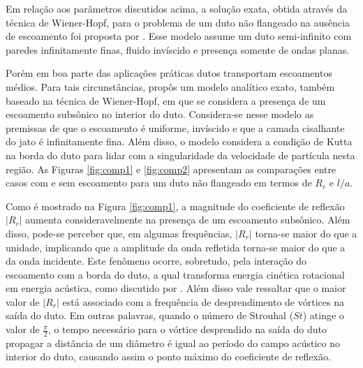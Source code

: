 Em relação aos parâmetros discutidos acima, a solução exata, obtida através da técnica de Wiener-Hopf, para o problema de um duto não flangeado na ausência de escoamento foi proposta por . Esse modelo assume um duto semi-infinito com paredes infinitamente finas, fluido invíscido e presença somente de ondas planas. 

 Porém em boa parte das aplicações práticas dutos transportam escoamentos médios. Para tais circunstâncias,  propôs um modelo analítico exato, também baseado na técnica de Wiener-Hopf, em que se considera a presença de um escoamento subsônico no interior do duto. Considera-se nesse modelo as premissas de que o escoamento é uniforme, invíscido e que a camada cisalhante do jato é infinitamente fina. Além disso, o modelo considera a condição de Kutta na borda do duto para lidar com a singularidade da velocidade de partícula nesta região. As Figuras \ref{fig:comp1} e \ref{fig:comp2} apresentam as comparações entre casos com e sem escoamento para um duto não flangeado em termos de $R_{r}$ e $l/a$.

\begin{figure}[ht!]
\centering
  
\end{figure}

\newpage
Como é mostrado na Figura \ref{fig:comp1}, a magnitude do coeficiente de reflexão $|R_{r}|$ aumenta consideravelmente na presença de um escoamento subsônico. Além disso, pode-se perceber que, em algumas frequências, $|R_{r}|$ torna-se maior do que a unidade, implicando que a amplitude da onda refletida torna-se maior do que a da onda incidente. Este fenômeno ocorre, sobretudo, pela interação do escoamento com a borda do duto, a qual transforma energia cinética rotacional em energia acústica, como discutido por . Além disso vale ressaltar que o maior valor de $|R_{r}|$ está associado com a frequência de desprendimento de vórtices na saída do duto. Em outras palavras, quando o número de Strouhal ($St$) atinge o valor de $\frac{\pi}{2}$, o tempo necessário para o vórtice desprendido na saída do duto propagar a distância de um diâmetro é igual ao período do campo acústico no interior do duto, causando assim o ponto máximo do coeficiente de reflexão.

\begin{figure}[ht!]
\centering
  
\end{figure}

